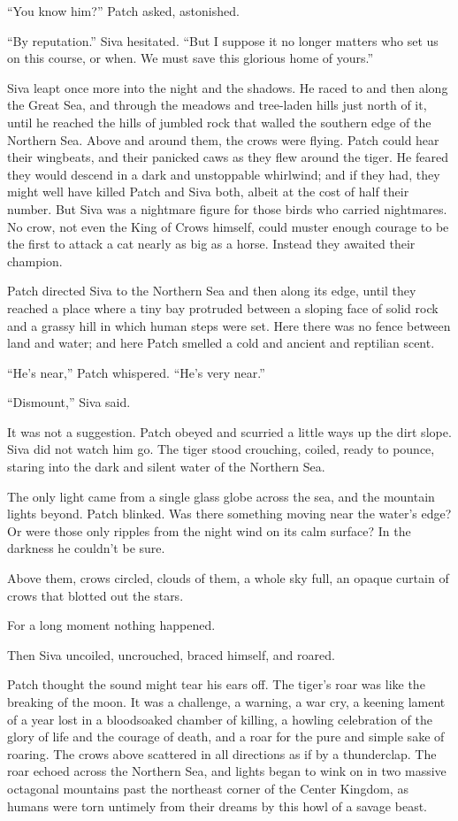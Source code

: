 \documentclass[12pt]{memoir}
\begin{document}
“You know him?” Patch asked, astonished.

“By reputation.” Siva hesitated. “But I suppose it no longer matters
who set us on this course, or when. We must save this glorious home of
yours.”

Siva leapt once more into the night and the shadows. He raced to and
then along the Great Sea, and through the meadows and tree-laden hills
just north of it, until he reached the hills of jumbled rock that
walled the southern edge of the Northern Sea. Above and around them,
the crows were flying. Patch could hear their wingbeats, and their
panicked caws as they flew around the tiger. He feared they would
descend in a dark and unstoppable whirlwind; and if they had, they
might well have killed Patch and Siva both, albeit at the cost of half
their number. But Siva was a nightmare figure for those birds who
carried nightmares. No crow, not even the King of Crows himself, could
muster enough courage to be the first to attack a cat nearly as big as
a horse. Instead they awaited their champion.

Patch directed Siva to the Northern Sea and then along its edge, until
they reached a place where a tiny bay protruded between a sloping face
of solid rock and a grassy hill in which human steps were set. Here
there was no fence between land and water; and here Patch smelled a
cold and ancient and reptilian scent.

“He’s near,” Patch whispered. “He’s very near.”

“Dismount,” Siva said.

It was not a suggestion. Patch obeyed and scurried a little ways up
the dirt slope. Siva did not watch him go. The tiger stood crouching,
coiled, ready to pounce, staring into the dark and silent water of the
Northern Sea.

The only light came from a single glass globe across the sea, and the
mountain lights beyond. Patch blinked. Was there something moving near
the water’s edge? Or were those only ripples from the night wind on
its calm surface? In the darkness he couldn’t be sure.

Above them, crows circled, clouds of them, a whole sky full, an opaque
curtain of crows that blotted out the stars.

For a long moment nothing happened.

Then Siva uncoiled, uncrouched, braced himself, and roared.

Patch thought the sound might tear his ears off. The tiger’s roar was
like the breaking of the moon. It was a challenge, a warning, a war
cry, a keening lament of a year lost in a bloodsoaked chamber of
killing, a howling celebration of the glory of life and the courage of
death, and a roar for the pure and simple sake of roaring. The crows
above scattered in all directions as if by a thunderclap. The roar
echoed across the Northern Sea, and lights began to wink on in two
massive octagonal mountains past the northeast corner of the Center
Kingdom, as humans were torn untimely from their dreams by this howl
of a savage beast.
\end{document}
